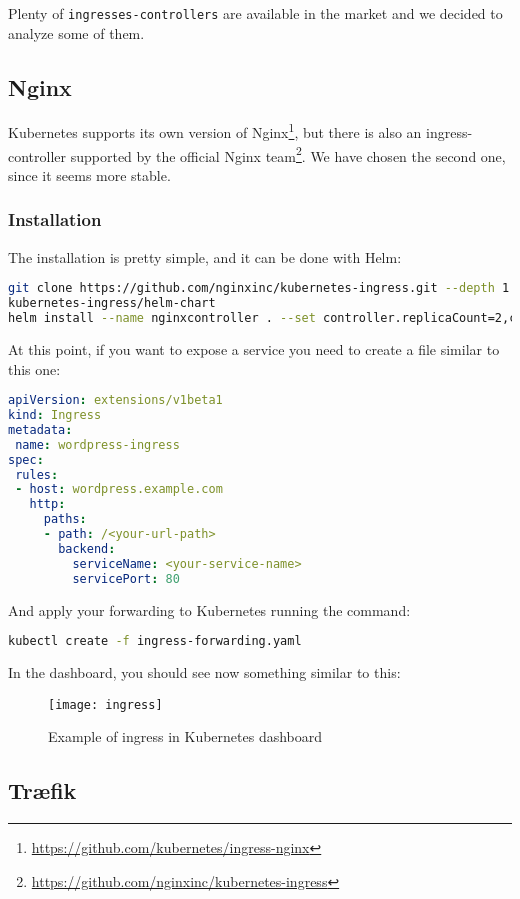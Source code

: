 Plenty of \texttt{ingresses-controllers} are available in the market and we
decided to analyze some of them.

\subsection{Nginx}
\label{nginx}
Kubernetes supports its own version of Nginx\footnote{
\url{https://github.com/kubernetes/ingress-nginx}}, but there is also an
ingress-controller supported by the official Nginx team\footnote{
\url{https://github.com/nginxinc/kubernetes-ingress}}.
We have chosen the second one, since it seems more stable.

\subsubsection{Installation}
\label{installation}

The installation is pretty simple, and it can be done with Helm:
\begin{lstlisting}[language=bash]
git clone https://github.com/nginxinc/kubernetes-ingress.git --depth 1 # Clone the project repository
kubernetes-ingress/helm-chart
helm install --name nginxcontroller . --set controller.replicaCount=2,controller.service.type=NodePort,controller.service.externalTrafficPolicy=Cluster # Install the helm package
\end{lstlisting}
At this point, if you want to expose a service you need to create a file
similar to this one:
\begin{lstlisting}[language=yaml]
apiVersion: extensions/v1beta1
kind: Ingress
metadata:
 name: wordpress-ingress
spec:
 rules:
 - host: wordpress.example.com
   http:
     paths:
     - path: /<your-url-path>
       backend:
         serviceName: <your-service-name>
         servicePort: 80
\end{lstlisting}
And apply your forwarding to Kubernetes running the command:
\begin{lstlisting}[language=bash]
kubectl create -f ingress-forwarding.yaml
\end{lstlisting}
In the dashboard, you should see now something similar to this:
\begin{figure}[htbp]
\centering
\texttt{[image: ingress]}
\caption{Example of ingress in Kubernetes dashboard}
\end{figure}

\subsection{Træfik}
\label{truxe6fik}


